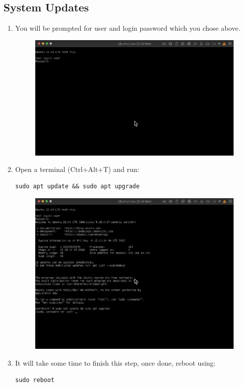\documentclass[11pt,a4paper]{article}
\begin{document}
\subsection{System Updates}
\begin{enumerate}
    \item You will be prompted for user and login password which you chose above.
    \begin{figure}[htp]
            \centering
            \includegraphics[width=0.5\linewidth]{images/step20.png}
        \end{figure}

    \item Open a terminal (Ctrl+Alt+T) and run:
\begin{lstlisting}
sudo apt update && sudo apt upgrade
\end{lstlisting}
    \begin{figure}[htp]
            \centering
            \includegraphics[width=0.5\linewidth]{images/step21.png}
        \end{figure}
    \item It will take some time to finish this step, once done, reboot using:
\begin{lstlisting}
sudo reboot
\end{lstlisting}
\end{enumerate}
\end{document}
